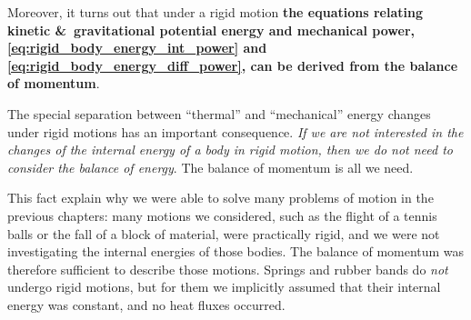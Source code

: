 \documentclass[a4paper,12pt,%
onecolumn,oneside,%
british%
]{memoir}
\newcommand*{\amp}{\&}
\renewcommand*{\|}[1][]{\nonscript\:#1\vert\nonscript\:\mathopen{}}
\begin{document}
Moreover, it turns out that under a rigid motion \textbf{the equations relating kinetic \amp\ gravitational potential energy and mechanical power, \eqref{eq:rigid_body_energy_int_power} and \eqref{eq:rigid_body_energy_diff_power}, can be derived from the balance of momentum}.

The special separation between \enquote{thermal} and \enquote{mechanical} energy changes under rigid motions has an important consequence. \emph{If we are not interested in the changes of the internal energy of a body in rigid motion, then we do not need to consider the balance of energy}. The balance of momentum is all we need.

This fact explain why we were able to solve many problems of motion in the previous chapters: many motions we considered, such as the flight of a tennis balls or the fall of a block of material, were practically rigid, and we were not investigating the internal energies of those bodies. The balance of momentum was therefore sufficient to describe those motions. Springs and rubber bands do \emph{not} undergo rigid motions, but for them we implicitly assumed that their internal energy was constant, and no heat fluxes occurred.

\medskip

\end{document}
